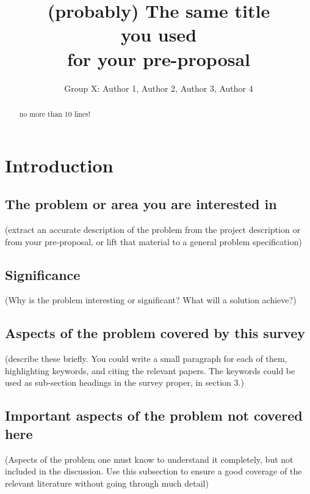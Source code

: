 \documentclass[a4paper,11pt]{article}
\begin{document}
\title{
(probably) The same title\\
you used \\
for your pre-proposal\\}
\author{Group X: Author 1, Author 2, Author 3, Author 4}
\maketitle
\begin{abstract}\centering
no more than 10 lines!
\end{abstract}

\section{Introduction}
\subsection{The problem or area you are interested in}
(extract an accurate description of the problem from the project
description or from your pre-proposal, or lift that material to a general problem specification)

\subsection{Significance}
(Why is the problem interesting or significant? What will a solution achieve?)

\subsection{Aspects of the problem covered by this survey}
(describe these briefly. You could write a small paragraph for each of them, highlighting keywords, and citing the relevant papers. The keywords could be used as sub-section headings in the survey proper, in section 3.)

\subsection{Important aspects of the problem not covered here}
(Aspects of the problem one must know to understand it completely, but not included in the discussion. Use this subsection to ensure a good coverage of the relevant literature without going through much detail)
\end{document}
